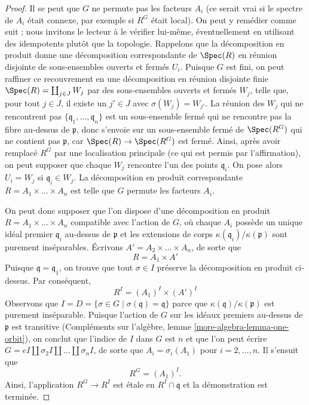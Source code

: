 \begin{proof}
\medskip\noindent
Il se peut que $G$ ne permute pas les facteurs $A_i$
(ce serait vrai si le spectre de $A_i$ était connexe,
par exemple si $R^G$ était local). On peut y remédier comme suit ;
nous invitons le lecteur à le vérifier lui-même, éventuellement
en utilisant des idempotents plutôt que la topologie.
Rappelons que la décomposition en produit donne une décomposition correspondante
de $\Spec(R)$ en réunion disjointe de sous-ensembles ouverts et fermés
$U_i$. Puisque $G$ est fini, on peut raffiner ce recouvrement
en une décomposition en réunion disjointe finie
$\Spec(R) = \coprod_{j \in J} W_j$ par des sous-ensembles ouverts
et fermés $W_j$, telle que, pour tout $j \in J$, il existe
un $j' \in J$ avec $\sigma(W_j) = W_{j'}$. La réunion des
$W_j$ qui ne rencontrent pas $\{\mathfrak q_1, \ldots, \mathfrak q_n\}$
est un sous-ensemble fermé qui ne rencontre pas la fibre au-dessus de $\mathfrak p$,
donc s'envoie sur un sous-ensemble fermé de $\Spec(R^G)$ qui ne contient pas
$\mathfrak p$, car $\Spec(R) \to \Spec(R^G)$ est fermé.
Ainsi, après avoir remplacé $R^G$ par une localisation principale
(ce qui est permis par l'affirmation), on peut supposer que chaque $W_j$ rencontre
l'un des points $\mathfrak q_i$. On pose alors $U_i = W_j$
si $\mathfrak q_i \in W_j$. La décomposition en produit correspondante
$R = A_1 \times \ldots \times A_n$ est telle
que $G$ permute les facteurs $A_i$.

\medskip\noindent
On peut donc supposer que l'on dispose d'une décomposition en produit
$R = A_1 \times \ldots \times A_n$ compatible avec l'action de $G$,
où chaque $A_i$ possède un unique idéal premier $\mathfrak q_i$ au-dessus
de $\mathfrak p$ et les extensions de corps
$\kappa(\mathfrak q_i)/\kappa(\mathfrak p)$ sont purement inséparables.
Écrivons $A' = A_2 \times \ldots \times A_n$, de sorte que
$$
R = A_1 \times A'
$$
Puisque $\mathfrak q = \mathfrak q_1$, on trouve que tout
$\sigma \in I$ préserve la décomposition en produit ci-dessus.
Par conséquent,
$$
R^I = (A_1)^I \times (A')^I
$$
Observons que $I = D = \{\sigma \in G \mid \sigma(\mathfrak q) = \mathfrak q\}$
parce que $\kappa(\mathfrak q)/\kappa(\mathfrak p)$ est purement inséparable.
Puisque l'action de $G$ sur les idéaux premiers au-dessus de $\mathfrak p$ est transitive
(Compléments sur l'algèbre, lemme \ref{more-algebra-lemma-one-orbit}),
on conclut que l'indice de $I$ dans $G$ est $n$ et que l'on peut écrire
$G = eI \amalg \sigma_2I \amalg \ldots \amalg \sigma_nI$, de sorte que
$A_i = \sigma_i(A_1)$ pour $i = 2, \ldots, n$. Il s'ensuit que
$$
R^G = (A_1)^I.
$$
Ainsi, l'application $R^G \to R^I$ est étale en $R^I \cap \mathfrak q$
et la démonstration est terminée.
\end{proof}

